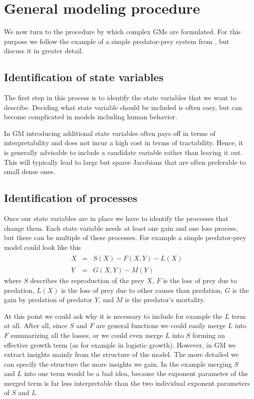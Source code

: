 \documentclass{article}
\newcommand{\eqa}[1]{\begin{eqnarray}#1\end{eqnarray}}
\begin{document}
\section{General modeling procedure} \label{secProcedure}
We now turn to the procedure by which complex GMs are formulated. For this purpose we follow the example of a simple predator-prey system from \cite{Yeakel2011TE}, but discuss it in greater detail.

\subsection{Identification of state variables}
The first step in this process is to identify the state variables that we want to describe. Deciding what state variable should be included is often easy, but can become complicated in models including human behavior. 

In GM introducing additional state variables often pays off in terms of interpretability and does not incur a high cost in terms of tractability. Hence, it is generally advisable to include a candidate variable rather than leaving it out. This will typically lead to large but sparse Jacobians that are often preferable to small dense ones.        

\subsection{Identification of processes}
Once our state variables are in place we have to identify the processes that change them. Each state variable needs at least one gain and one loss process, but there can be multiple of these processes. For example a simple predator-prey model could look like this 
\eqa{
\dot{X}&=&S(X)-F(X,Y)-L(X)\\
\dot{Y}&=&G(X,Y)-M(Y)
}
where $S$ describes the reproduction of the prey $X$, $F$ is the loss of prey due to predation, $L(X)$ is the loss of prey due to other causes than predation, $G$ is the gain by predation of predator $Y$, and $M$ is the predator's mortality. 

At this point we could ask why it is necessary to include for example the $L$ term at all. After all, since $S$ and $F$ are general functions we could easily merge $L$ into $F$ summarizing all the losses, or we could even merge $L$ into $S$ forming an effective growth term (as for example in logistic growth). However, in GM we extract insights mainly from the structure of the model. The more detailed we can specify the structure the more insights we gain. In the example merging $S$ and $L$ into one term would be a bad idea, because the exponent parameter of the merged term is far less interpretable than the two individual exponent parameters of $S$ and $L$. 
\end{document}
